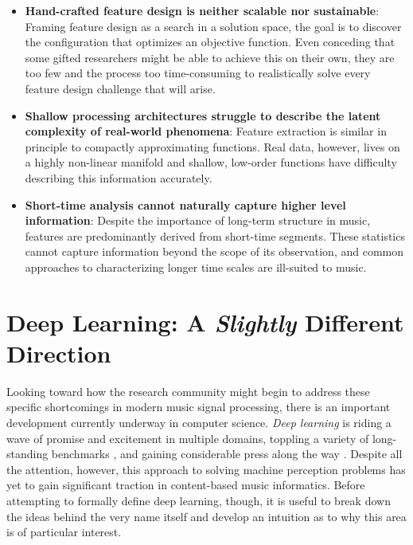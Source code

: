 \begin{itemize}

\item \textbf{Hand-crafted feature design is neither scalable nor sustainable}: Framing feature design as a search in a solution space, the goal is to discover the configuration that optimizes an objective function. Even conceding that some gifted researchers might be able to achieve this on their own, they are too few and the process too time-consuming to realistically solve every feature design challenge that will arise. \\
\item \textbf{Shallow processing architectures struggle to describe the latent complexity of real-world phenomena}: Feature extraction is similar in principle to compactly approximating functions. Real data, however, lives on a highly non-linear manifold and shallow, low-order functions have difficulty describing this information accurately. \\
\item \textbf{Short-time analysis cannot naturally capture higher level information}: Despite the importance of long-term structure in music, features are predominantly derived from short-time segments. These statistics cannot capture information beyond the scope of its observation, and common approaches to characterizing longer time scales are ill-suited to music.\\

\end{itemize}

\section{Deep Learning: A \emph{Slightly} Different Direction}
\label{sec:deep_learning}

Looking toward how the research community might begin to address these specific shortcomings in modern music signal processing, there is an important development currently underway in computer science.
\emph{Deep learning} is riding a wave of promise and excitement in multiple domains, toppling a variety of long-standing benchmarks \cite{Imagenet, MSR}, and gaining considerable press along the way \cite{Yann, Catz, Hinton}.
Despite all the attention, however, this approach to solving machine perception problems has yet to gain significant traction in content-based music informatics.
Before attempting to formally define deep learning, though, it is useful to break down the ideas behind the very name itself and develop an intuition as to why this area is of particular interest.


